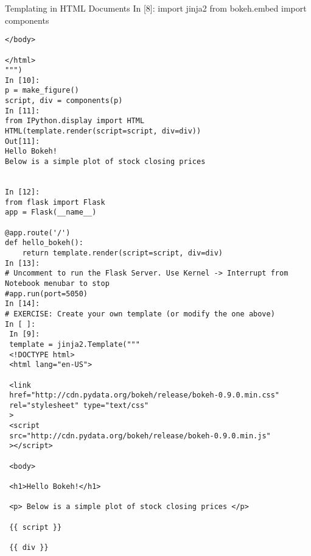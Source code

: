 \documentclass[a4paper,12pt]{article}
\begin{document}
Templating in HTML Documents
In [8]:
import jinja2
from bokeh.embed import components
\begin{verbatim}
</body>

</html>
""")
In [10]:
p = make_figure()
script, div = components(p)
In [11]:
from IPython.display import HTML
HTML(template.render(script=script, div=div))
Out[11]:
Hello Bokeh!
Below is a simple plot of stock closing prices

	
In [12]:
from flask import Flask
app = Flask(__name__)

@app.route('/')
def hello_bokeh():
    return template.render(script=script, div=div)
In [13]:
# Uncomment to run the Flask Server. Use Kernel -> Interrupt from Notebook menubar to stop 
#app.run(port=5050)
In [14]:
# EXERCISE: Create your own template (or modify the one above) 
In [ ]:
 In [9]:
 template = jinja2.Template("""
 <!DOCTYPE html>
 <html lang="en-US">
 
 <link
 href="http://cdn.pydata.org/bokeh/release/bokeh-0.9.0.min.css"
 rel="stylesheet" type="text/css"
 >
 <script 
 src="http://cdn.pydata.org/bokeh/release/bokeh-0.9.0.min.js"
 ></script>
 
 <body>
 
 <h1>Hello Bokeh!</h1>
 
 <p> Below is a simple plot of stock closing prices </p>
 
 {{ script }}
 
 {{ div }}
\end{verbatim}
%
%
%
%
%
\end{document}

